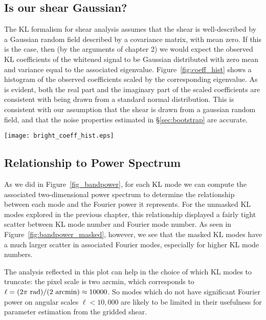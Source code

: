 \subsection{Is our shear Gaussian?}
The KL formalism for shear analysis assumes that the shear is well-described
by a Gaussian random field described by a covariance matrix, with mean
zero.  If this is the case, then (by the arguments of chapter 2) we would
expect the observed KL coefficients of the whitened signal to be Gaussian
distributed with zero mean and variance equal to the associated eigenvalue.
Figure~\ref{fig:coeff_hist} shows a histogram of the observed coefficients
scaled by the corresponding eigenvalue.  As is evident, both the real
part and the imaginary part of the scaled coefficients are consistent with
being drawn from a standard normal distribution.  This is consistent with
our assumption that the shear is drawn from a gaussian random field, and
that the noise properties estimated in \S\ref{sec:bootstrap} are accurate.

\begin{figure*}
 \centering
 \texttt{[image: bright\_coeff\_hist.eps]}
 \caption{
   The histogram of normalized coefficients $a_i / \sqrt{\lambda_i}$.
   If the shear is truly a gaussian random field, this distribution should
   be a gaussian with unit variance.
   \label{fig:coeff_hist}}
\end{figure*}

\subsection{Relationship to Power Spectrum}
As we did in Figure~\ref{fig_bandpower}, for each KL mode we can compute the
associated two-dimensional power spectrum to determine the relationship
between each mode and the Fourier power it represents.  For the unmasked
KL modes explored in the previous chapter, this relationship displayed a
fairly tight scatter between KL mode number and Fourier mode number.
As seen in Figure~\ref{fig:bandpower_masked}, however, we see that the
masked KL modes have a much larger scatter in associated Fourier modes,
especially for higher KL mode numbers.

The analysis reflected in this plot can help in the choice of which KL
modes to truncate: the pixel scale is two arcmin, which corresponds to
$\ell = (2\pi\ {\rm rad}) / (2\ {\rm arcmin}) \approx 10000$.  So modes
which do not have significant Fourier power on angular scales
$\ell < 10,000$ are likely to be limited in their usefulness for parameter
estimation from the gridded shear.

